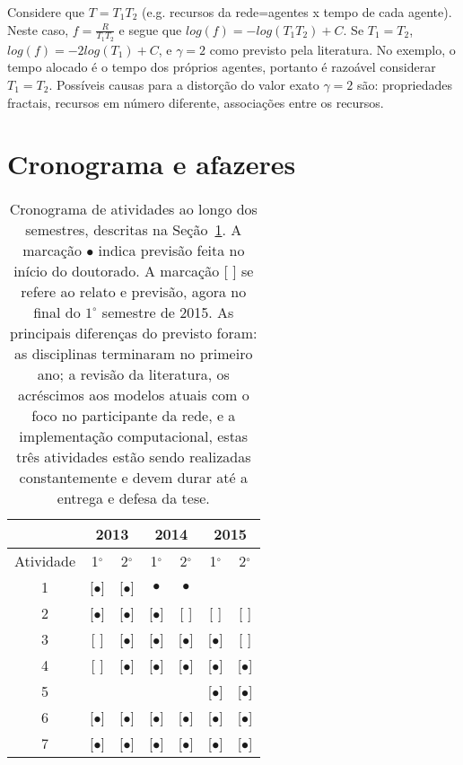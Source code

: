 \documentclass[a4paper,openright,12pt]{report} %
\begin{document}
Considere que $T=T_1 T_2$ 
(e.g. recursos da rede=agentes x tempo de cada agente). 
Neste caso,
$f=\frac{R}{T_1 T_2}$ e
segue que $log(f)=-log(T_1 T_2) +C$. Se $T_1=T_2$, 
$log(f)=-2 log(T_1) + C$, e
$\gamma=2$ como previsto pela literatura.
No exemplo, o tempo alocado
é o tempo dos próprios agentes,
portanto é razoável considerar $T_1=T_2$. 
Possíveis causas para a distorção do valor exato $\gamma=2$
são: propriedades fractais, recursos em número diferente, associações entre os recursos. 

\chapter{Cronograma e afazeres}\label{sec:chr}

\begin{table}[h]
\begin{center}
  \caption{ \footnotesize Cronograma de atividades ao longo dos semestres, descritas na Seção~\ref{sec:chr}.
      A marcação $\bullet$ indica previsão feita no início do doutorado.
  A marcação [ ] se refere ao relato e previsão, agora no final do $1^{\circ}$ semestre de 2015.
  As principais diferenças do previsto foram: as disciplinas terminaram no primeiro ano; a revisão da literatura, os acréscimos aos modelos atuais com o foco no participante da rede, e a implementação computacional, estas três atividades estão sendo realizadas constantemente e devem durar até a entrega e defesa da tese. }
\label{tab:cron}
  \begin{tabular}{ | c ||   c | c |     c | c |   c | c |}
    \hline
      & \multicolumn{2}{|c|}{2013} & \multicolumn{2}{|c|}{2014} & \multicolumn{2}{|c|}{2015} \\
    \hline
    Atividade & 1$^{\circ}$ & 2$^{\circ}$ & 1$^{\circ}$ & 2$^{\circ}$ & 1$^{\circ}$ & 2$^{\circ}$ \\
    \hline \hline

    1 & [$\bullet$] & [$\bullet$] & $\bullet$ & $\bullet$ & & \\
    \hline
    2 & [$\bullet$] & [$\bullet$] & [$\bullet$] & [ ] & [ ] & [ ] \\
    \hline
    3 & [ ] & [$\bullet$] & [$\bullet$] & [$\bullet$] & [$\bullet$] & [ ]  \\
    \hline
    4 & [ ] & [$\bullet$] & [$\bullet$] & [$\bullet$] & [$\bullet$] & [$\bullet$]  \\
    \hline
    5 & & & & & [$\bullet$] & [$\bullet$]  \\
    \hline
    6 & [$\bullet$] & [$\bullet$] & [$\bullet$] & [$\bullet$] & [$\bullet$] & [$\bullet$]  \\
    \hline
    7 & [$\bullet$] & [$\bullet$] & [$\bullet$] & [$\bullet$] & [$\bullet$] & [$\bullet$]  \\
    \hline
  \end{tabular}
\end{center}
\end{table}
\end{document}
